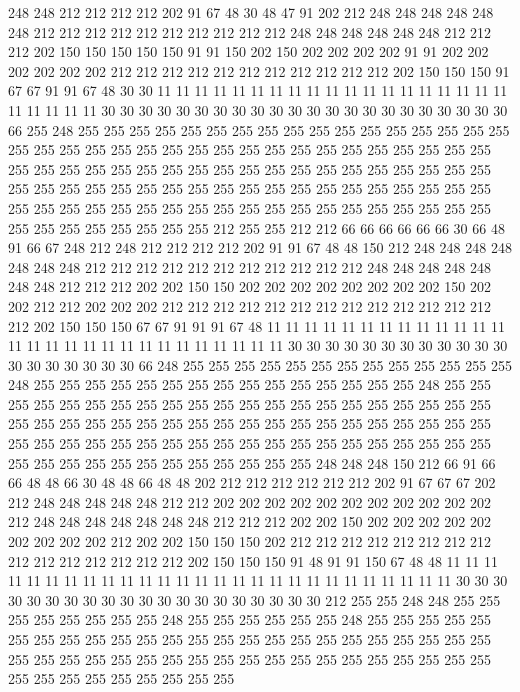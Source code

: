 248 248 212 212 212 212 202 91 67 48 30 48 47 91 202 212 248 248 248 248
248 248 212 212 212 212 212 212 212 212 212 212 248 248 248 248 248 248 212 212
212 202 150 150 150 150 150 91 91 150 202 150 202 202 202 202 91 91 202 202
202 202 202 202 212 212 212 212 212 212 212 212 212 212 212 202 150 150 150 91
67 67 91 91 67 48 30 30 11 11 11 11 11 11 11 11 11 11 11 11
11 11 11 11 11 11 11 11 11 11 11 11 30 30 30 30 30 30 30 30
30 30 30 30 30 30 30 30 30 30 30 30 30 30 66 255 248 255 255 255
255 255 255 255 255 255 255 255 255 255 255 255 255 255 255 255 255 255 255 255
255 255 255 255 255 255 255 255 255 255 255 255 255 255 255 255 255 255 255 255
255 255 255 255 255 255 255 255 255 255 255 255 255 255 255 255 255 255 255 255
255 255 255 255 255 255 255 255 255 255 255 255 255 255 255 255 255 255 255 255
255 255 255 255 255 255 255 255 255 255 255 255 255 255 255 255 255 255 212 255
255 212 212 66 66 66 66 66 66 30 66 48 91 66 67 248 212 248 212 212
212 212 202 91 91 67 48 48 150 212 248 248 248 248 248 248 248 212 212 212
212 212 212 212 212 212 212 212 248 248 248 248 248 248 248 212 212 212 202 202
150 150 202 202 202 202 202 202 202 202 150 202 202 212 212 202 202 202 212 212
212 212 212 212 212 212 212 212 212 212 212 212 202 150 150 150 67 67 91 91
91 67 48 11 11 11 11 11 11 11 11 11 11 11 11 11 11 11 11 11
11 11 11 11 11 11 11 11 11 11 11 30 30 30 30 30 30 30 30 30
30 30 30 30 30 30 30 30 30 30 66 248 255 255 255 255 255 255 255 255
255 255 255 255 255 248 255 255 255 255 255 255 255 255 255 255 255 255 255 255
255 248 255 255 255 255 255 255 255 255 255 255 255 255 255 255 255 255 255 255
255 255 255 255 255 255 255 255 255 255 255 255 255 255 255 255 255 255 255 255
255 255 255 255 255 255 255 255 255 255 255 255 255 255 255 255 255 255 255 255
255 255 255 255 255 255 255 255 255 255 255 255 255 248 248 248 150 212 66 91
66 66 48 48 66 30 48 48 66 48 48 202 212 212 212 212 212 212 202 91
67 67 67 202 212 248 248 248 248 248 212 212 202 202 202 202 202 202 202 202
202 202 202 212 248 248 248 248 248 248 248 212 212 212 202 202 150 202 202 202
202 202 202 202 202 202 212 202 202 150 150 150 202 212 212 212 212 212 212 212
212 212 212 212 212 212 212 212 202 150 150 150 91 48 91 91 150 67 48 48
11 11 11 11 11 11 11 11 11 11 11 11 11 11 11 11 11 11 11 11
11 11 11 11 11 11 11 30 30 30 30 30 30 30 30 30 30 30 30 30
30 30 30 30 30 30 30 212 255 255 248 248 255 255 255 255 255 255 255 255
248 255 255 255 255 255 255 248 255 255 255 255 255 255 255 255 255 255 255 255
255 255 255 255 255 255 255 255 255 255 255 255 255 255 255 255 255 255 255 255
255 255 255 255 255 255 255 255 255 255 255 255 255 255 255 255 255 255 255 255
